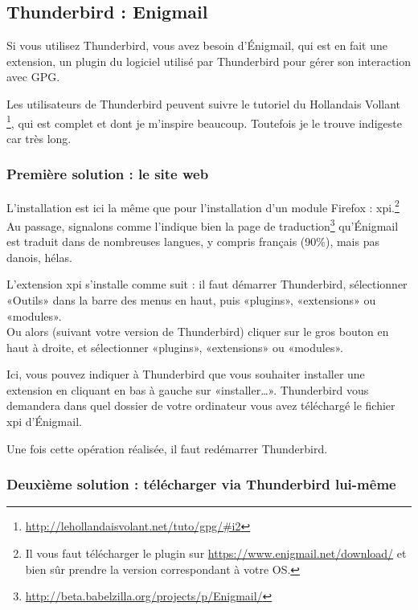 \subsection{Thunderbird : Enigmail}\label{thunderbird-enigmail}

Si vous utilisez Thunderbird, vous avez besoin d'Énigmail, qui est en
fait une extension, un plugin du logiciel utilisé par Thunderbird pour
gérer son interaction avec GPG.

Les utilisateurs de Thunderbird peuvent suivre le tutoriel du Hollandais Vollant
\footnote{\url{http://lehollandaisvolant.net/tuto/gpg/\#i2}}, qui est
complet et dont je m'inspire beaucoup. Toutefois je le trouve indigeste
car très long.

\subsubsection{Première solution : le site web}\label{premiuxe8re-solution-le-site-web}

L'installation est ici la même que pour l'installation d'un module
Firefox : xpi.\footnote{Il vous faut télécharger le plugin sur
\url{https://www.enigmail.net/download/} et bien sûr
prendre la version correspondant à votre OS.} 
Au passage, signalons comme l'indique bien
la page de traduction\footnote{\url{http://beta.babelzilla.org/projects/p/Enigmail/}} qu'Énigmail est traduit dans de nombreuses langues, y
compris français (90\%), mais pas danois, hélas.

L'extension xpi s'installe comme suit : il faut démarrer Thunderbird,
sélectionner «Outils» dans la barre des menus en haut, puis «plugins»,
«extensions» ou «modules».\\Ou alors (suivant votre version de
Thunderbird) cliquer sur le gros bouton en haut à droite, et
sélectionner «plugins», «extensions» ou «modules».

Ici, vous pouvez indiquer à Thunderbird que vous souhaiter installer une
extension en cliquant en bas à gauche sur «installer\ldots{}».
Thunderbird vous demandera dans quel dossier de votre ordinateur vous
avez téléchargé le fichier xpi d'Énigmail.

Une fois cette opération réalisée, il faut redémarrer Thunderbird.

\subsubsection{Deuxième solution : télécharger via Thunderbird lui-même}\label{deuxiuxe8me-solution-tuxe9luxe9charger-via-thunderbird-lui-muxeame}

